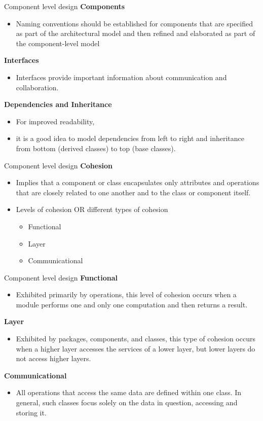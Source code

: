 \documentclass{beamer}
\begin{document}
\begin{frame}{Component level design }
	\textbf{Components }
	\begin{itemize}
		\item Naming conventions should be established for components that are specified as part of the architectural model and then refined and elaborated as part of the component-level model
	\end{itemize}
	\textbf{Interfaces }
	\begin{itemize}
		\item Interfaces provide important information about communication and collaboration.
	\end{itemize}
	\textbf{Dependencies and Inheritance }
	\begin{itemize}
		\item For improved readability,
		\item it is a good idea to model dependencies from left to right and inheritance from bottom (derived classes) to top (base classes).
	\end{itemize}
\end{frame}
\begin{frame}{Component level design }
	\textbf{Cohesion}
	\begin{itemize}
		\item Implies that a component or class encapsulates only attributes and operations that are closely related to one another and to the class or component itself.
		\item Levels of cohesion OR different types of cohesion
		\begin{itemize}
			\item Functional
			\item Layer
			\item Communicational
		\end{itemize}
	\end{itemize}
\end{frame}
\begin{frame}{Component level design}
	\textbf{Functional}
	\begin{itemize}
		\item Exhibited primarily by operations, this level of cohesion occurs when a module performs one and only one computation and then returns a result.
	\end{itemize}
	\textbf{Layer} 
	\begin{itemize}
		\item Exhibited by packages, components, and classes, this type of cohesion occurs when a higher layer accesses the services of a lower layer, but lower layers do not access higher layers.
	\end{itemize}   
	\textbf{Communicational}
	\begin{itemize}
		\item All operations that access the same data are defined within one class. In general, such classes focus solely on the data in question, accessing and storing it.
	\end{itemize}
\end{frame}
\end{document}
